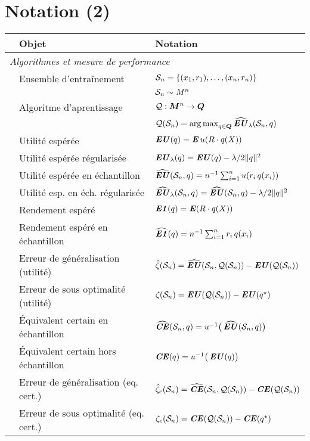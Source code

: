 \clearpage

\section*{Notation (2)}

\begin{tabular}{@{}lll}
  &\textbf{Objet} & \textbf{Notation}\\
  \midrule
  \multicolumn{3}{l}{\textit{Algorithmes et mesure de performance}\hspace{40ex}\,}\\[1ex]
  &Ensemble d'entraînement & $\S_n = \{(x_1,r_1),\ldots,(x_n,r_n)\}$\\
  &               &$\S_n\sim M^n$\\[0.8ex]
  & Algoritme d'aprentissage & $\alg:\M^n\to\Q$\\
  & &$\alg(\S_n) = \argmax_{q \in \Q}\hEU_\lambda(\S_n,q)$\\[0.8ex]
  & Utilité espérée  & $\EU(q) = \E u(R\cdot q(X))$\\[0.8ex]
  & Utilité espérée régularisée  & $\EU_\lambda(q) = \EU(q) - \lambda/2\|q\|^2$\\[0.8ex]  
  & Utilité espérée en échantillon & $\hEU(\S_n,q) = n^{-1}\sumi u(r_i\,q(x_i))$\\[0.8ex]
  & Utilité esp. en éch. régularisée & $\hEU_\lambda(\S_n,q) = \hEU(\S_n,q) - \lambda/2\|q\|^2$\\[0.8ex]
  & Rendement espéré & $\EN(q) = \E(R\cdot q(X))$\\[0.8ex]
  & Rendement espéré en échantillon & $\hEN(q) = n^{-1}\sumi r_i\,q(x_i)$\\[0.8ex]
  & Erreur de généralisation (utilité) & $\hat\zeta(\S_n) = \hEU(\S_n,\alg(\S_n)) -
                                         \EU(\alg(\S_n))$\\[0.8ex]
  & Erreur de sous optimalité (utilité) & $\zeta(\S_n) = \EU(\alg(\S_n)) -
                                          \EU(q^\star)$\\[0.8ex]    
  & Équivalent certain en échantillon & $\hCE(\S_n,q) =
                                        u^{-1}\big(\hEU(\S_n,q)\big)$\\[0.8ex]
  & Équivalent certain hors échantillon & $\CE(q) = u^{-1}\big(\EU(q)\big)$\\[0.8ex]
  & Erreur de généralisation (eq. cert.) & $\hat\zeta_e(\S_n) = \hCE(\S_n,\alg(\S_n)) -
                                           \CE(\alg(\S_n))$\\[0.8ex]
  & Erreur de sous optimalité (eq. cert.) & $\zeta_e(\S_n) = \CE(\alg(\S_n)) -
                                            \CE(q^\star)$\\[0.8ex]    
  \bottomrule
\end{tabular}

